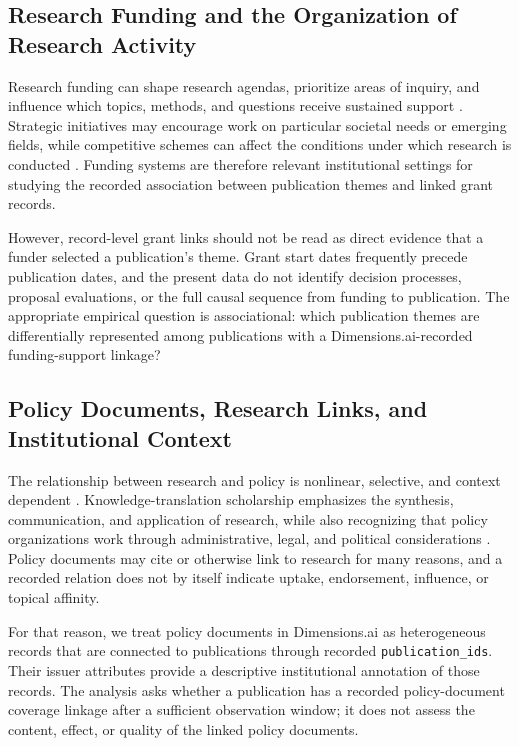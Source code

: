 \documentclass[12pt]{article}
\begin{document}
\subsection{Research Funding and the Organization of Research Activity}

Research funding can shape research agendas, prioritize areas of inquiry, and influence which topics, methods, and questions receive sustained support \citep{laudel2014,franssen2018}. Strategic initiatives may encourage work on particular societal needs or emerging fields, while competitive schemes can affect the conditions under which research is conducted \citep{kayyali2025,cartier2018,schweiger2024}. Funding systems are therefore relevant institutional settings for studying the recorded association between publication themes and linked grant records.

However, record-level grant links should not be read as direct evidence that a funder selected a publication's theme. Grant start dates frequently precede publication dates, and the present data do not identify decision processes, proposal evaluations, or the full causal sequence from funding to publication. The appropriate empirical question is associational: which publication themes are differentially represented among publications with a Dimensions.ai-recorded funding-support linkage?

\subsection{Policy Documents, Research Links, and Institutional Context}

The relationship between research and policy is nonlinear, selective, and context dependent \citep{almeida2006,ritman2014}. Knowledge-translation scholarship emphasizes the synthesis, communication, and application of research, while also recognizing that policy organizations work through administrative, legal, and political considerations \citep{lauck2023,jaca2023,oelke2015}. Policy documents may cite or otherwise link to research for many reasons, and a recorded relation does not by itself indicate uptake, endorsement, influence, or topical affinity.

For that reason, we treat policy documents in Dimensions.ai as heterogeneous records that are connected to publications through recorded \texttt{publication\_ids}. Their issuer attributes provide a descriptive institutional annotation of those records. The analysis asks whether a publication has a recorded policy-document coverage linkage after a sufficient observation window; it does not assess the content, effect, or quality of the linked policy documents.
\end{document}
